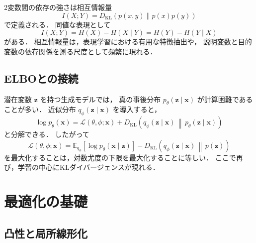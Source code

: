 2変数間の依存の強さは相互情報量
\begin{equation}
  I(X;Y)
  =
  D_{\mathrm{KL}}(p(x,y)\|p(x)p(y))
  \label{eq:mutual-information}
\end{equation}
で定義される．
同値な表現として
\begin{equation}
  I(X;Y) = H(X) - H(X\mid Y) = H(Y) - H(Y\mid X)
  \label{eq:mi-entropy}
\end{equation}
がある．
相互情報量は，表現学習における有用な特徴抽出や，
説明変数と目的変数の依存関係を測る尺度として頻繁に現れる．

\subsection{ELBOとの接続}

潜在変数 $\boldsymbol{z}$ を持つ生成モデルでは，
真の事後分布 $p_{\theta}(\boldsymbol{z}\mid \boldsymbol{x})$ が計算困難であることが多い．
近似分布 $q_{\phi}(\boldsymbol{z}\mid \boldsymbol{x})$ を導入すると，
\begin{equation}
  \log p_{\theta}(\boldsymbol{x})
  =
  \mathcal{L}(\theta,\phi;\boldsymbol{x})
  +
  D_{\mathrm{KL}}
  \left(
    q_{\phi}(\boldsymbol{z}\mid \boldsymbol{x})
    \,\middle\|\,
    p_{\theta}(\boldsymbol{z}\mid \boldsymbol{x})
  \right)
  \label{eq:elbo-decomposition}
\end{equation}
と分解できる．
したがって
\begin{equation}
  \mathcal{L}(\theta,\phi;\boldsymbol{x})
  =
  \mathbb{E}_{q_{\phi}}
  \left[
    \log p_{\theta}(\boldsymbol{x}\mid\boldsymbol{z})
  \right]
  -
  D_{\mathrm{KL}}
  \left(
    q_{\phi}(\boldsymbol{z}\mid \boldsymbol{x})
    \,\middle\|\,
    p(\boldsymbol{z})
  \right)
  \label{eq:elbo}
\end{equation}
を最大化することは，対数尤度の下限を最大化することに等しい．
ここで再び，学習の中心にKLダイバージェンスが現れる．

\section{最適化の基礎}
\label{sec:ml-optimization}

\subsection{凸性と局所線形化}

